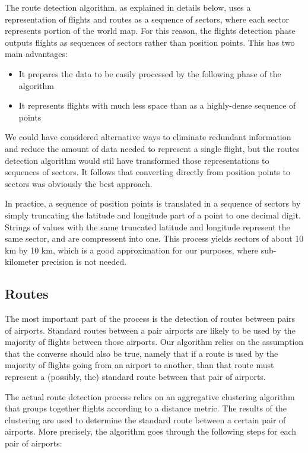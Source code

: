 \documentclass{vldb}
\begin{document}
The route detection algorithm, as explained in details below, uses a
representation of flights and routes as a sequence of sectors, where each sector
represents portion of the world map. For this reason, the flights detection
phase outputs flights as sequences of sectors rather than position points. This
has two main advantages:

\begin{itemize}
  \item It prepares the data to be easily processed by the following phase of
  the algorithm
  \item It represents flights with much less space than as a highly-dense
  sequence of points
\end{itemize}

We could have considered alternative ways to eliminate redundant information and
reduce the amount of data needed to represent a single flight, but the routes
detection algorithm would stil have transformed those representations to
sequences of sectors. It follows that converting directly from position points
to sectors was obviously the best approach.

In practice, a sequence of position points is translated in a sequence of
sectors by simply truncating the latitude and longitude part of a point to one
decimal digit. Strings of values with the same truncated latitude and
longitude represent the same sector, and are compressent into one. This process
yields sectors of about 10 km by 10 km, which is a good approximation for our
purposes, where sub-kilometer precision is not needed.

\subsection{Routes}

The most important part of the process is the detection of routes between pairs
of airports. Standard routes between a pair airports are likely to be used by
the majority of flights between those airports. Our algorithm relies on the
assumption that the converse should also be true, namely that if a route is used
by the majority of flights going from an airport to another, than that route
must represent a (possibly, the) standard route between that pair of airports.

The actual route detection process relies on an aggregative clustering algorithm
that groups together flights according to a distance metric. The results of the
clustering are used to determine the standard route between a certain pair of
airports. More precisely, the algorithm goes through the following steps for
each pair of airports:
\end{document}
